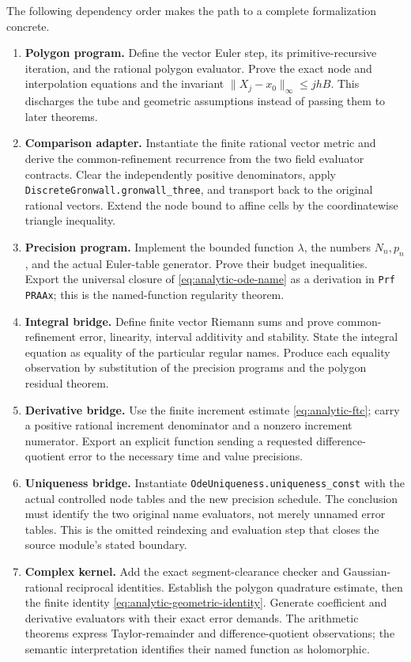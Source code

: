 The following dependency order makes the path to a complete formalization concrete.
\begin{enumerate}
 \item \textbf{Polygon program.} Define the vector Euler step, its primitive-recursive iteration, and the rational polygon evaluator.  Prove the exact node and interpolation equations and the invariant $\|X_j-x_0\|_\infty\le jhB$.  This discharges the tube and geometric assumptions instead of passing them to later theorems.
 \item \textbf{Comparison adapter.} Instantiate the finite rational vector metric and derive the common-refinement recurrence from the two field evaluator contracts.  Clear the independently positive denominators, apply \texttt{DiscreteGronwall.gronwall\_three}, and transport back to the original rational vectors.  Extend the node bound to affine cells by the coordinatewise triangle inequality.
 \item \textbf{Precision program.} Implement the bounded function $\lambda$, the numbers $N_n,p_n$, and the actual Euler-table generator.  Prove their budget inequalities.  Export the universal closure of \eqref{eq:analytic-ode-name} as a derivation in \texttt{Prf PRAAx}; this is the named-function regularity theorem.
 \item \textbf{Integral bridge.} Define finite vector Riemann sums and prove common-refinement error, linearity, interval additivity and stability.  State the integral equation as equality of the particular regular names.  Produce each equality observation by substitution of the precision programs and the polygon residual theorem.
 \item \textbf{Derivative bridge.} Use the finite increment estimate \eqref{eq:analytic-ftc}; carry a positive rational increment denominator and a nonzero increment numerator.  Export an explicit function sending a requested difference-quotient error to the necessary time and value precisions.
 \item \textbf{Uniqueness bridge.} Instantiate \texttt{OdeUniqueness.uniqueness\_const} with the actual controlled node tables and the new precision schedule.  The conclusion must identify the two original name evaluators, not merely unnamed error tables.  This is the omitted reindexing and evaluation step that closes the source module's stated boundary.
 \item \textbf{Complex kernel.} Add the exact segment-clearance checker and Gaussian-rational reciprocal identities.  Establish the polygon quadrature estimate, then the finite identity \eqref{eq:analytic-geometric-identity}.  Generate coefficient and derivative evaluators with their exact error demands.  The arithmetic theorems express Taylor-remainder and difference-quotient observations; the semantic interpretation identifies their named function as holomorphic.
\end{enumerate}

